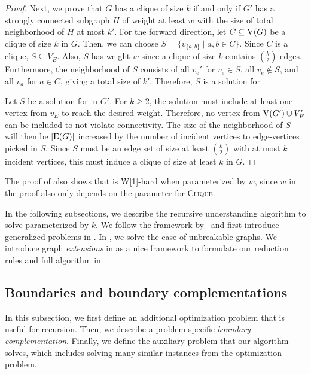 \begin{theorem}
\begin{proof}
 
 Next, we prove that $G$ has a clique of size $k$ if and only if $G'$ has a strongly connected subgraph $H$ of weight at least $w$ with the size of total neighborhood of $H$ at most $k'$. For the forward direction, let $C \subseteq \operatorname{V}({G})$ be a clique of size $k$ in $G$. Then, we can choose $S = \{v_{\{a, b\}} \mid a, b \in C\}$. Since $C$ is a clique, $S \subseteq V_E$. Also, $S$ has weight $w$ since a clique of size $k$ contains $\binom{k}{2}$ edges. Furthermore, the neighborhood of $S$ consists of all $v_e'$ for $v_e \in S$, all $v_e \notin S$, and all $v_a$ for $a \in C$, giving a total size of $k'$. Therefore, $S$ is a solution for \scs{}.

  Let $S$ be a solution for \scs{} in $G'$. For $k \ge 2$, the solution must include at least one vertex from $v_E$ to reach the desired weight. Therefore, no vertex from $\operatorname{V}({G'}) \cup V_E'$ can be included to not violate connectivity. The size of the neighborhood of $S$ will then be $\abs{\e{G}}$ increased by the number of incident vertices to edge-vertices picked in $S$. Since $S$ must be an edge set of size at least $\binom{k}{2}$ with at most $k$ incident vertices, this must induce a clique of size at least $k$ in $G$.
\end{proof}
\fi

The proof of  also shows that \scs{} is W[1]-hard when parameterized by $w$, since $w$ in the proof also only depends on the parameter for \textsc{Clique}.

In the following subsections, we describe the recursive understanding algorithm to solve \scs{} parameterized by $k$.
We follow the framework by~\cite{chitnis2016designing,golovach2020finding} and first introduce generalized problems in . In , we solve the case of unbreakable graphs. We introduce graph \emph{extensions} in  as a nice framework to formulate our reduction rules and full algorithm in .


\subsection{Boundaries and boundary complementations}\label{sec:scc_bc}

In this subsection, we first define an additional optimization problem that is useful for recursion. Then, we describe a problem-specific \emph{boundary complementation}. Finally, we define the auxiliary problem that our algorithm solves, which includes solving many similar instances from the optimization problem.


\end{theorem}
